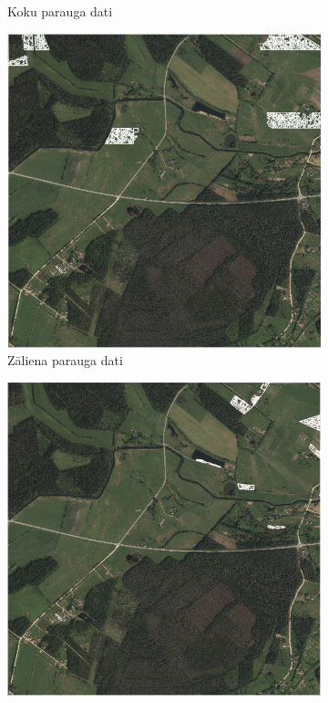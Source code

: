 \documentclass[12pt,paper=a4]{report}
\begin{document}
\begin{figure}[h!]
\begin{subfigure}[b]{.32\linewidth}
\caption{Koku parauga dati}\label{fig:kokiSampleNN}
\end{subfigure}
\begin{subfigure}[b]{.32\linewidth}
\includegraphics[width=\linewidth]{zaliensSampleNN}
\caption{Zāliena parauga dati}
\label{fig:zaliensSampleNN}
\end{subfigure}
\begin{subfigure}[b]{.32\linewidth}
\includegraphics[width=\linewidth]{lauksSampleNN}

\end{subfigure}
\end{figure}
\end{document}
